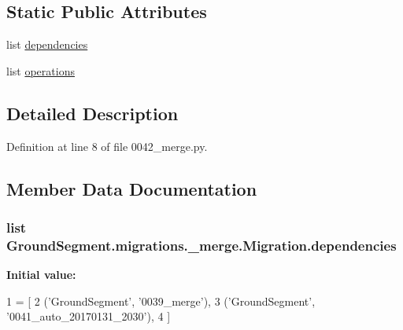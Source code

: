 \subsection*{Static Public Attributes}
\begin{DoxyCompactItemize}
\item 
list \hyperlink{class_ground_segment_1_1migrations_1_10042__merge_1_1_migration_aaf9ae80e21724ce24f52be95016fa8ff}{dependencies}
\item 
list \hyperlink{class_ground_segment_1_1migrations_1_10042__merge_1_1_migration_a3e055653a53207f64ea9ac5865f16d44}{operations}
\end{DoxyCompactItemize}


\subsection{Detailed Description}


Definition at line 8 of file 0042\+\_\+merge.\+py.



\subsection{Member Data Documentation}
\hypertarget{class_ground_segment_1_1migrations_1_10042__merge_1_1_migration_aaf9ae80e21724ce24f52be95016fa8ff}{}
\subsubsection[{dependencies}]{\setlength{\rightskip}{0pt plus 5cm}list Ground\+Segment.\+migrations.\+\_\+merge.\+Migration.\+dependencies\hspace{0.3cm}{\ttfamily [static]}}\label{class_ground_segment_1_1migrations_1_10042__merge_1_1_migration_aaf9ae80e21724ce24f52be95016fa8ff}
{\bfseries Initial value\+:}
\begin{DoxyCode}
1 = [
2         (\textcolor{stringliteral}{'GroundSegment'}, \textcolor{stringliteral}{'0039\_merge'}),
3         (\textcolor{stringliteral}{'GroundSegment'}, \textcolor{stringliteral}{'0041\_auto\_20170131\_2030'}),
4     ]
\end{DoxyCode}


